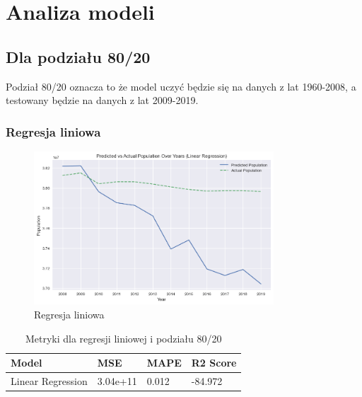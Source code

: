 \documentclass[11pt]{article}
\begin{document}
\section{Analiza modeli}
\subsection{Dla podziału 80/20}
Podział 80/20 oznacza to że model uczyć będzie się na danych z lat 1960-2008, a testowany będzie na danych z lat 2009-2019.
\subsubsection{Regresja liniowa}
\begin{figure}[H]
        \centering
        \includegraphics[width=0.8\textwidth]{images/linear.png}
        \caption{Regresja liniowa}
\end{figure}
\begin{table}[H]
        \centering
        \begin{tabular}{|l|l|l|l|}
        \hline
        Model & MSE & MAPE & R2 Score \\ \hline
        Linear Regression & 3.04e+11 & 0.012 & -84.972 \\ \hline
        \end{tabular}
        \caption{Metryki dla regresji liniowej i podziału 80/20}
        \end{table}
\end{document}
